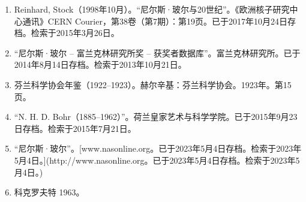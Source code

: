 \begin{enumerate}
\item Reinhard, Stock（1998年10月）。“尼尔斯·玻尔与20世纪”。《欧洲核子研究中心通讯》CERN Courier，第38卷（第7期）：第19页。已于2017年10月24日存档。检索于2015年3月26日。
\item “尼尔斯·玻尔 – 富兰克林研究所奖 – 获奖者数据库”。富兰克林研究所。已于2014年8月14日存档。检索于2013年10月21日。
\item 芬兰科学协会年鉴（1922–1923）。赫尔辛基：芬兰科学协会。1923年。第15页。
\item “N. H. D. Bohr（1885–1962）”。荷兰皇家艺术与科学学院。已于2015年9月23日存档。检索于2015年7月21日。
\item “尼尔斯·玻尔”。[www.nasonline.org。已于2023年5月4日存档。检索于2023年5月4日。](http://www.nasonline.org。已于2023年5月4日存档。检索于2023年5月4日。)
\item 科克罗夫特 1963。


\end{enumerate}